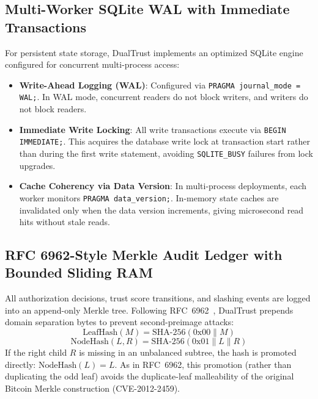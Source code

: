 \documentclass[journal]{IEEEtran}
\begin{document}
\subsection{Multi-Worker SQLite WAL with Immediate Transactions}
For persistent state storage, DualTrust implements an optimized SQLite engine configured for concurrent multi-process access:
\begin{itemize}[leftmargin=12pt, topsep=2pt, itemsep=1pt]
\item \textbf{Write-Ahead Logging (WAL)}: Configured via \texttt{PRAGMA journal\_mode = WAL;}. In WAL mode, concurrent readers do not block writers, and writers do not block readers.
\item \textbf{Immediate Write Locking}: All write transactions execute via \texttt{BEGIN IMMEDIATE;}. This acquires the database write lock at transaction start rather than during the first write statement, avoiding \texttt{SQLITE\_BUSY} failures from lock upgrades.
\item \textbf{Cache Coherency via Data Version}: In multi-process deployments, each worker monitors \texttt{PRAGMA data\_version;}. In-memory state caches are invalidated only when the data version increments, giving microsecond read hits without stale reads.
\end{itemize}

\subsection{RFC 6962-Style Merkle Audit Ledger with Bounded Sliding RAM}
All authorization decisions, trust score transitions, and slashing events are logged into an append-only Merkle tree. Following RFC~6962~\cite{laurie2013certificate}, DualTrust prepends domain separation bytes to prevent second-preimage attacks:
\begin{equation}
\text{LeafHash}(M) = \text{SHA-256}(0\text{x}00 \parallel M)
\end{equation}
\begin{equation}
\text{NodeHash}(L, R) = \text{SHA-256}(0\text{x}01 \parallel L \parallel R)
\end{equation}
If the right child $R$ is missing in an unbalanced subtree, the hash is promoted directly: $\text{NodeHash}(L) = L$. As in RFC~6962, this promotion (rather than duplicating the odd leaf) avoids the duplicate-leaf malleability of the original Bitcoin Merkle construction (CVE-2012-2459).
\end{document}
